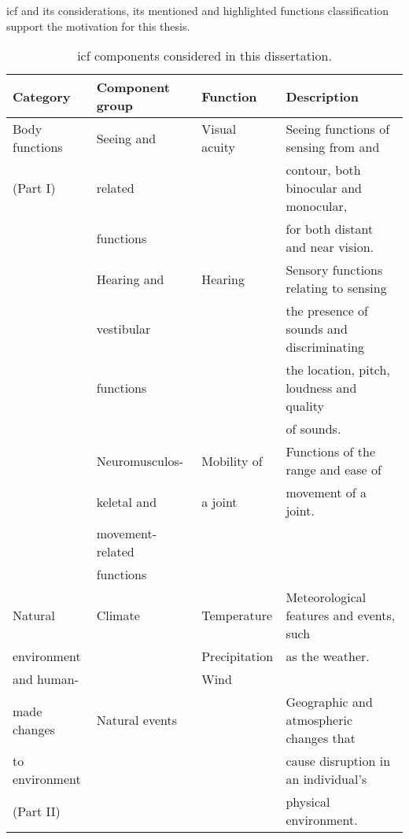 

\ac{icf} and its considerations, its mentioned and highlighted functions
classification support the motivation for this thesis.

\begin{table}
  \caption{\ac{icf} components considered in this dissertation.}
  \label{tbl:icf}
  \footnotesize
  \centering
  \begin{tabular}{l l l l}
    \hline
    \textbf{Category} 	& \textbf{Component group}& \textbf{Function}& \textbf{Description}\\
    \hline
    Body functions& Seeing and 	 	& Visual acuity	& Seeing functions of sensing from and	\\
    (Part I)	& related		& 		& contour, both binocular and monocular,\\
		& functions		& 		& for both distant and near vision.	\\
		& Hearing and 		& Hearing 	& Sensory functions relating to sensing \\
		& vestibular		& 		& the presence of sounds and discriminating\\
		& functions		& 		& the location, pitch, loudness and quality\\
		& 			&		& of sounds.				\\
		& Neuromusculos- 	& Mobility of 	& Functions of the range and ease of	\\ 
		& keletal and 		& a joint	& movement of a joint.			\\
		& movement-related 	& 		& 					\\
		& functions		&		&					\\
    \hline
    Natural 	& Climate		& Temperature	& Meteorological features and events, such\\
    environment & 			& Precipitation	& as the weather.			\\
    and human-	&			& Wind		& 					\\
    made changes& Natural events	& 		& Geographic and atmospheric changes that\\
    to environment& 			& 		& cause disruption in an individual's 	\\
    (Part II)	& 			& 		& physical environment.			\\

\end{tabular}
\end{table}
